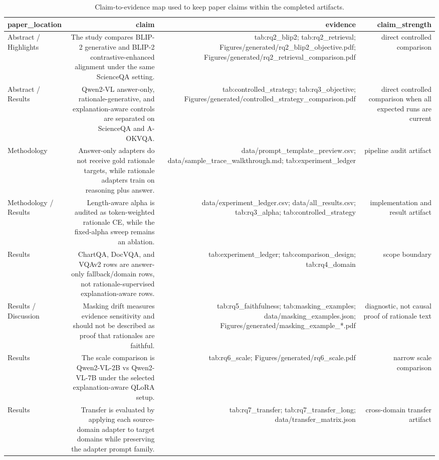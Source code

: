 \begin{table}
\caption{Claim-to-evidence map used to keep paper claims within the completed artifacts.}
\label{tab:claim_evidence}
\begin{tabular}{lrrr}
\toprule
paper_location & claim & evidence & claim_strength \\
\midrule
Abstract / Highlights & The study compares BLIP-2 generative and BLIP-2 contrastive-enhanced alignment under the same ScienceQA setting. & tab:rq2_blip2; tab:rq2_retrieval; Figures/generated/rq2_blip2_objective.pdf; Figures/generated/rq2_retrieval_comparison.pdf & direct controlled comparison \\
Abstract / Results & Qwen2-VL answer-only, rationale-generative, and explanation-aware controls are separated on ScienceQA and A-OKVQA. & tab:controlled_strategy; tab:rq3_objective; Figures/generated/controlled_strategy_comparison.pdf & direct controlled comparison when all expected runs are current \\
Methodology & Answer-only adapters do not receive gold rationale targets, while rationale adapters train on reasoning plus answer. & data/prompt_template_preview.csv; data/sample_trace_walkthrough.md; tab:experiment_ledger & pipeline audit artifact \\
Methodology / Results & Length-aware alpha is audited as token-weighted rationale CE, while the fixed-alpha sweep remains an ablation. & data/experiment_ledger.csv; data/all_results.csv; tab:rq3_alpha; tab:controlled_strategy & implementation and result artifact \\
Results & ChartQA, DocVQA, and VQAv2 rows are answer-only fallback/domain rows, not rationale-supervised explanation-aware rows. & tab:experiment_ledger; tab:comparison_design; tab:rq4_domain & scope boundary \\
Results / Discussion & Masking drift measures evidence sensitivity and should not be described as proof that rationales are faithful. & tab:rq5_faithfulness; tab:masking_examples; data/masking_examples.json; Figures/generated/masking_example_*.pdf & diagnostic, not causal proof of rationale text \\
Results & The scale comparison is Qwen2-VL-2B vs Qwen2-VL-7B under the selected explanation-aware QLoRA setup. & tab:rq6_scale; Figures/generated/rq6_scale.pdf & narrow scale comparison \\
Results & Transfer is evaluated by applying each source-domain adapter to target domains while preserving the adapter prompt family. & tab:rq7_transfer; tab:rq7_transfer_long; data/transfer_matrix.json & cross-domain transfer artifact \\
\bottomrule
\end{tabular}
\end{table}
